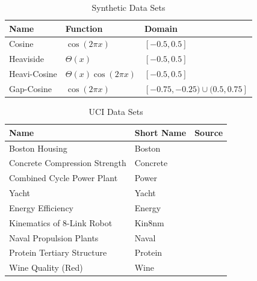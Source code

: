 \begin{table}
    \centering
    \begin{tabular}{lll}
        \toprule
        \textbf{Name} & \textbf{Function}         & \textbf{Domain}                   \\ \midrule
        Cosine        & $\cos(2 \pi x)$           & $[-0.5, 0.5]$                     \\
        Heaviside     & $\Theta(x)$               & $[-0.5, 0.5]$                     \\
        Heavi-Cosine  & $\Theta(x) \cos(2 \pi x)$ & $[-0.5, 0.5]$                     \\
        Gap-Cosine    & $\cos(2 \pi x)$           & $[-0.75, -0.25) \cup (0.5, 0.75]$ \\
        \bottomrule
    \end{tabular}
    \caption{Synthetic Data Sets}
    \label{tab:dataSynthetic}
\end{table}

\begin{table}
    \centering
    \begin{tabular}{lll}
        \toprule
        \textbf{Name}                 & \textbf{Short Name} & \textbf{Source}\cite{duaUCIMachineLearning2017}       \\ \midrule
        Boston Housing                & Boston   &                                                                  \\
        Concrete Compression Strength & Concrete & \cite{yehModelingStrengthHighperformance1998}                    \\
        Combined Cycle Power Plant    & Power    & \cite{kayaLocalGlobalLearning2012,tufekciPredictionFullLoad2014} \\
        Yacht                         & Yacht    &                                                                  \\
        Energy Efficiency             & Energy   & \cite{tsanasAccurateQuantitativeEstimation2012}                  \\
        Kinematics of 8-Link Robot    & Kin8nm   &                                                                  \\
        Naval Propulsion Plants       & Naval    & \cite{coradduMachineLearningApproaches2016}                      \\
        Protein Tertiary Structure    & Protein  &                                                                  \\
        Wine Quality (Red)            & Wine     & \cite{cortezModelingWinePreferences2009}                         \\
        \bottomrule
    \end{tabular}
    \caption{\acs{UCI} Data Sets}
    \label{tab:dataUci}
\end{table}


